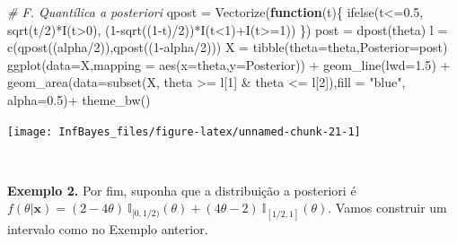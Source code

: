 \documentclass[
]{book}
\newenvironment{Shaded}{\begin{snugshade}}{\end{snugshade}}
\newcommand{\AttributeTok}[1]{\textcolor[rgb]{0.77,0.63,0.00}{#1}}
\newcommand{\CommentTok}[1]{\textcolor[rgb]{0.56,0.35,0.01}{\textit{#1}}}
\newcommand{\ControlFlowTok}[1]{\textcolor[rgb]{0.13,0.29,0.53}{\textbf{#1}}}
\newcommand{\DecValTok}[1]{\textcolor[rgb]{0.00,0.00,0.81}{#1}}
\newcommand{\FloatTok}[1]{\textcolor[rgb]{0.00,0.00,0.81}{#1}}
\newcommand{\FunctionTok}[1]{\textcolor[rgb]{0.00,0.00,0.00}{#1}}
\newcommand{\NormalTok}[1]{#1}
\newcommand{\OtherTok}[1]{\textcolor[rgb]{0.56,0.35,0.01}{#1}}
\newcommand{\SpecialCharTok}[1]{\textcolor[rgb]{0.00,0.00,0.00}{#1}}
\newcommand{\StringTok}[1]{\textcolor[rgb]{0.31,0.60,0.02}{#1}}
\begin{document}
\begin{Shaded}
\begin{Highlighting}[]
\CommentTok{\# F. Quantílica a posteriori}
\NormalTok{qpost }\OtherTok{=} \FunctionTok{Vectorize}\NormalTok{(}\ControlFlowTok{function}\NormalTok{(t)\{ }\FunctionTok{ifelse}\NormalTok{(t}\SpecialCharTok{\textless{}=}\FloatTok{0.5}\NormalTok{, }\FunctionTok{sqrt}\NormalTok{(t}\SpecialCharTok{/}\DecValTok{2}\NormalTok{)}\SpecialCharTok{*}\FunctionTok{I}\NormalTok{(t}\SpecialCharTok{\textgreater{}}\DecValTok{0}\NormalTok{),}
\NormalTok{    (}\DecValTok{1}\SpecialCharTok{{-}}\FunctionTok{sqrt}\NormalTok{((}\DecValTok{1}\SpecialCharTok{{-}}\NormalTok{t)}\SpecialCharTok{/}\DecValTok{2}\NormalTok{))}\SpecialCharTok{*}\FunctionTok{I}\NormalTok{(t}\SpecialCharTok{\textless{}}\DecValTok{1}\NormalTok{)}\SpecialCharTok{+}\FunctionTok{I}\NormalTok{(t}\SpecialCharTok{\textgreater{}=}\DecValTok{1}\NormalTok{)) \})}
\NormalTok{post }\OtherTok{=} \FunctionTok{dpost}\NormalTok{(theta)}
\NormalTok{l }\OtherTok{=} \FunctionTok{c}\NormalTok{(}\FunctionTok{qpost}\NormalTok{((alpha}\SpecialCharTok{/}\DecValTok{2}\NormalTok{)),}\FunctionTok{qpost}\NormalTok{((}\DecValTok{1}\SpecialCharTok{{-}}\NormalTok{alpha}\SpecialCharTok{/}\DecValTok{2}\NormalTok{)))}
\NormalTok{X }\OtherTok{=} \FunctionTok{tibble}\NormalTok{(}\AttributeTok{theta=}\NormalTok{theta,}\AttributeTok{Posterior=}\NormalTok{post)}
\FunctionTok{ggplot}\NormalTok{(}\AttributeTok{data=}\NormalTok{X,}\AttributeTok{mapping =} \FunctionTok{aes}\NormalTok{(}\AttributeTok{x=}\NormalTok{theta,}\AttributeTok{y=}\NormalTok{Posterior)) }\SpecialCharTok{+}
  \FunctionTok{geom\_line}\NormalTok{(}\AttributeTok{lwd=}\FloatTok{1.5}\NormalTok{) }\SpecialCharTok{+}
  \FunctionTok{geom\_area}\NormalTok{(}\AttributeTok{data=}\FunctionTok{subset}\NormalTok{(X, theta }\SpecialCharTok{\textgreater{}=}\NormalTok{ l[}\DecValTok{1}\NormalTok{] }\SpecialCharTok{\&}\NormalTok{ theta }\SpecialCharTok{\textless{}=}\NormalTok{ l[}\DecValTok{2}\NormalTok{]),}\AttributeTok{fill =} \StringTok{"blue"}\NormalTok{, }\AttributeTok{alpha=}\FloatTok{0.5}\NormalTok{)}\SpecialCharTok{+}
  \FunctionTok{theme\_bw}\NormalTok{()}
\end{Highlighting}
\end{Shaded}

\begin{center}\texttt{[image: InfBayes\_files/figure-latex/unnamed-chunk-21-1]} \end{center}

\(~\)

\textbf{Exemplo 2.} Por fim, suponha que a distribuição a posteriori é \(f(\theta|\boldsymbol{x})=(2-4\theta)~\mathbb{I}_{[0,1/2)}(\theta)+(4\theta-2)~\mathbb{I}_{[1/2,1]}(\theta)\). Vamos construir um intervalo como no Exemplo anterior.
\end{document}
